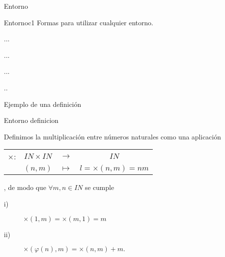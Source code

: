 \documentclass[]{beamer}
\theoremstyle{plain}
\begin{document}
\begin{frame}[fragile]{Entorno}
\begin{source}{Entorno}{c1}
Formas para utilizar cualquier entorno.
\begin{entorno}
 ...
\end{entorno}

\begin{entorno}[(?Descripción?)]
 ...
\end{entorno}

\begin{entorno}[(? Descripción ?)][referencia]
 ...
\end{entorno}

\begin{entorno}[][referencia] %
 ..
\end{entorno}

\end{source}
\end{frame}
\begin{frame}[fragile]{Ejemplo de una definición}
\begin{source}{Entorno definicion}{}
\begin{definicion}
Definimos la multiplicación entre números naturales como una aplicación
\begin{tabular}{cccc}
 $\times$: & $I\!N\times I\!N$ & $\rightarrow$ & %
$I\!N$%
\tabularnewline
 & $\left(n,m\right)$ & $\mapsto$ & $l=\times\left(n,m\right) = nm$\tabularnewline
\end{tabular}, de modo que $\forall m,n\in I\!N$ se cumple 
\begin{description}
\item [{i)}] $\times\left(1,m\right)=\times\left(m,1\right)=m$
\item [{ii)}] $\times\left(\varphi\left(n\right),m\right)=\times\left(n,m\right)+m.$
\end{description}

\end{definicion}
\end{source}
\end{frame}
\end{document}
